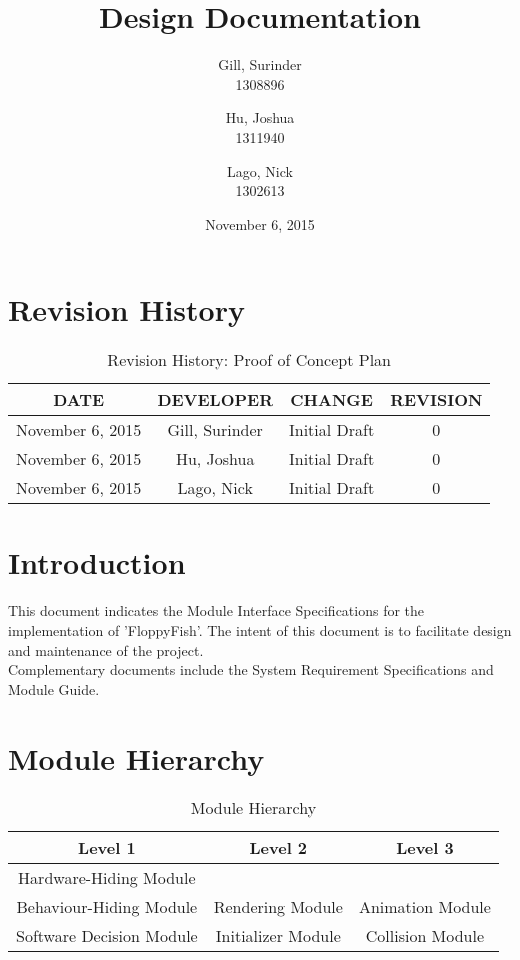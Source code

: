 \documentclass[11pt, oneside]{article}   	%
\title{Design Documentation
}
\author{Gill, Surinder\\
		1308896
		\and
		Hu, Joshua\\
		1311940
		\and
		Lago, Nick\\
		1302613}
\date{November 6, 2015}							%
\begin{document}
\maketitle
\newpage
\tableofcontents
\newpage

\section*{Revision History}

\begin{table}[hp]
\caption{Revision History: Proof of Concept Plan}
\begin{center}
\label{tab:}
\begin{tabular}{|c|c|c|c|}
\hline
\textbf{DATE} & \textbf{DEVELOPER} & \textbf{CHANGE} & \textbf{REVISION}\\
\hline
November 6, 2015 & Gill, Surinder & Initial Draft & 0\\
\hline
November 6, 2015 & Hu, Joshua & Initial Draft & 0\\
\hline
November 6, 2015 & Lago, Nick & Initial Draft & 0\\
\hline
\end{tabular}
\end{center}
\label{default}
\end{table}


\newpage
\section*{Introduction}

This document indicates the Module Interface Specifications for the implementation
of 'FloppyFish'. The intent of this document is to facilitate design and maintenance of the project.\\
Complementary documents include the System Requirement Specifications and Module
Guide.

\newpage
\section*{Module Hierarchy}

\begin{table}[H]
\caption{Module Hierarchy}
\begin{center}
\begin{tabular}{ccc}
\hline
\textbf{Level 1} & \textbf{Level 2} & \textbf{Level 3}\\
\hline
Hardware-Hiding Module & & \\
\hline
Behaviour-Hiding Module & Rendering Module & Animation Module\\
\hline
Software Decision Module & Initializer Module & Collision Module\\
\hline
\end{tabular}
\end{center}
\label{default}
\end{table}%
\end{document}
